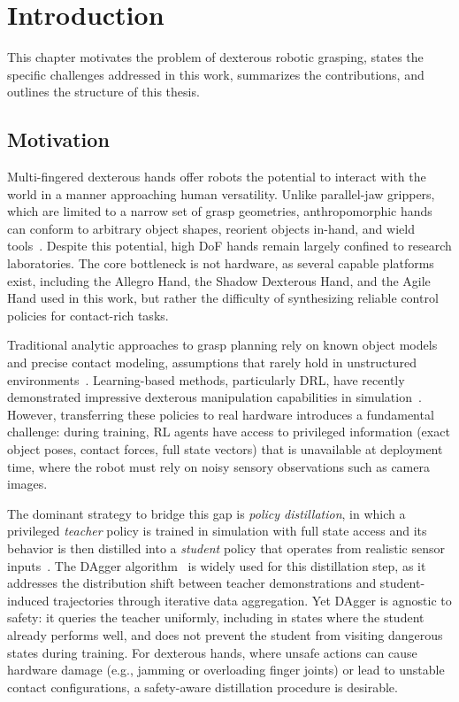 \chapter{Introduction}%
\label{ch:introduction}%

This chapter motivates the problem of dexterous robotic grasping, states the specific challenges addressed in this work, summarizes the contributions, and outlines the structure of this thesis.

\section{Motivation}%
\label{sec:motivation}%

Multi-fingered dexterous hands offer robots the potential to interact with the world in a manner approaching human versatility.
Unlike parallel-jaw grippers, which are limited to a narrow set of grasp geometries, anthropomorphic hands can conform to arbitrary object shapes, reorient objects in-hand, and wield tools~\cite{Tang2024}.
Despite this potential, high \ac{DoF} hands remain largely confined to research laboratories.
The core bottleneck is not hardware, as several capable platforms exist, including the Allegro Hand, the Shadow Dexterous Hand, and the Agile Hand used in this work, but rather the difficulty of synthesizing reliable control policies for contact-rich tasks.

Traditional analytic approaches to grasp planning rely on known object models and precise contact modeling, assumptions that rarely hold in unstructured environments~\cite{Wu2022}.
Learning-based methods, particularly \ac{DRL}, have recently demonstrated impressive dexterous manipulation capabilities in simulation~\cite{Handa2024, Lin2025}.
However, transferring these policies to real hardware introduces a fundamental challenge: during training, RL agents have access to privileged information (exact object poses, contact forces, full state vectors) that is unavailable at deployment time, where the robot must rely on noisy sensory observations such as camera images.

The dominant strategy to bridge this gap is \emph{policy distillation}, in which a privileged \emph{teacher} policy is trained in simulation with full state access and its behavior is then distilled into a \emph{student} policy that operates from realistic sensor inputs~\cite{Singh2025, Lum2024}.
The DAgger algorithm~\cite{Ross2011} is widely used for this distillation step, as it addresses the distribution shift between teacher demonstrations and student-induced trajectories through iterative data aggregation.
Yet DAgger is agnostic to safety: it queries the teacher uniformly, including in states where the student already performs well, and does not prevent the student from visiting dangerous states during training.
For dexterous hands, where unsafe actions can cause hardware damage (e.g., jamming or overloading finger joints) or lead to unstable contact configurations, a safety-aware distillation procedure is desirable.

